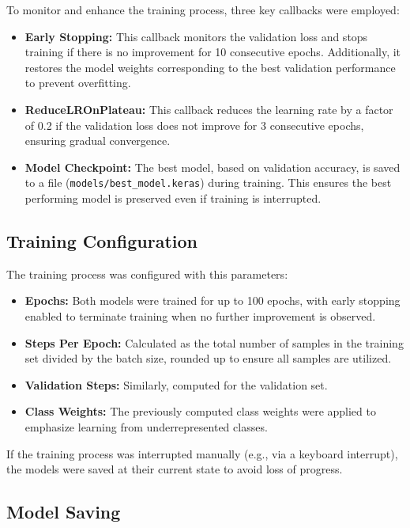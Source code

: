 \documentclass{article}
\begin{document}
To monitor and enhance the training process, three key callbacks were employed:
\begin{itemize}
    \item \textbf{Early Stopping:} This callback monitors the validation loss and stops training if there is no improvement for 10 consecutive epochs. Additionally, it restores the model weights corresponding to the best validation performance to prevent overfitting.
    \item \textbf{ReduceLROnPlateau:} This callback reduces the learning rate by a factor of 0.2 if the validation loss does not improve for 3 consecutive epochs, ensuring gradual convergence.
    \item \textbf{Model Checkpoint:} The best model, based on validation accuracy, is saved to a file (\texttt{models/best\_model.keras}) during training. This ensures the best performing model is preserved even if training is interrupted.
\end{itemize}

\subsection{Training Configuration}

The training process was configured with this parameters:
\begin{itemize}
    \item \textbf{Epochs:} Both models were trained for up to 100 epochs, with early stopping enabled to terminate training when no further improvement is observed.
    \item \textbf{Steps Per Epoch:} Calculated as the total number of samples in the training set divided by the batch size, rounded up to ensure all samples are utilized.
    \item \textbf{Validation Steps:} Similarly, computed for the validation set.
    \item \textbf{Class Weights:} The previously computed class weights were applied to emphasize learning from underrepresented classes.
\end{itemize}

If the training process was interrupted manually (e.g., via a keyboard interrupt), the models were saved at their current state to avoid loss of progress.

\subsection{Model Saving}
\end{document}
